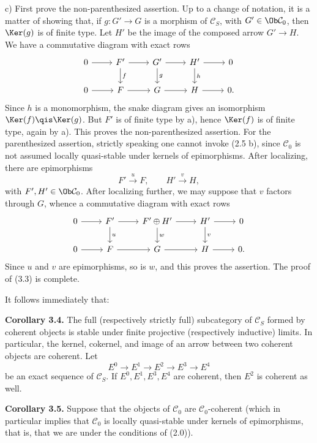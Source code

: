 c) First prove the non-parenthesized assertion. Up to a change of notation, it is a matter of showing that, if \(g:G'\to G\) is a morphism of \(\mathcal C_S\), with \(G'\in\Ob\mathcal C_0\), then \(\Ker(g)\) is of finite type. Let \(H'\) be the image of the composed arrow \(G'\to H\). We have a commutative diagram with exact rows
\[
\begin{tikzcd}
0\arrow[r]&F'\arrow[r]\arrow[d,"f"]&G'\arrow[r]\arrow[d,"g"]&H'\arrow[r]\arrow[d,"h"]&0\\
0\arrow[r]&F\arrow[r]&G\arrow[r]&H\arrow[r]&0 .
\end{tikzcd}
\]
Since \(h\) is a monomorphism, the snake diagram gives an isomorphism \(\Ker(f)\qis\Ker(g)\). But \(F'\) is of finite type by a), hence \(\Ker(f)\) is of finite type, again by a). This proves the non-parenthesized assertion. For the parenthesized assertion, strictly speaking one cannot invoke (2.5 b), since \(\mathcal C_0\) is not assumed locally quasi-stable under kernels of epimorphisms. After localizing, there are epimorphisms
\[
  F'\xrightarrow{u}F,
  \qquad H'\xrightarrow{v}H,
\]
with \(F',H'\in\Ob\mathcal C_0\). After localizing further, we may suppose that \(v\) factors through \(G\), whence a commutative diagram with exact rows
\[
\begin{tikzcd}
0\arrow[r]&F'\arrow[r]\arrow[d,"u"]&F'\oplus H'\arrow[r]\arrow[d,"w"]&H'\arrow[r]\arrow[d,"v"]&0\\
0\arrow[r]&F\arrow[r]&G\arrow[r]&H\arrow[r]&0 .
\end{tikzcd}
\]
Since \(u\) and \(v\) are epimorphisms, so is \(w\), and this proves the assertion. The proof of (3.3) is complete.

It follows immediately that:

\textbf{Corollary 3.4.} The full (respectively strictly full) subcategory of \(\mathcal C_S\) formed by coherent objects is stable under finite projective (respectively inductive) limits. In particular, the kernel, cokernel, and image of an arrow between two coherent objects are coherent. Let
\[
  E^0\longrightarrow E^1\longrightarrow E^2\longrightarrow E^3\longrightarrow E^4
\]
be an exact sequence of \(\mathcal C_S\). If \(E^0,E^1,E^3,E^4\) are coherent, then \(E^2\) is coherent as well.

\textbf{Corollary 3.5.} Suppose that the objects of \(\mathcal C_0\) are \(\mathcal C_0\)-coherent (which in particular implies that \(\mathcal C_0\) is locally quasi-stable under kernels of epimorphisms, that is, that we are under the conditions of (2.0)).

